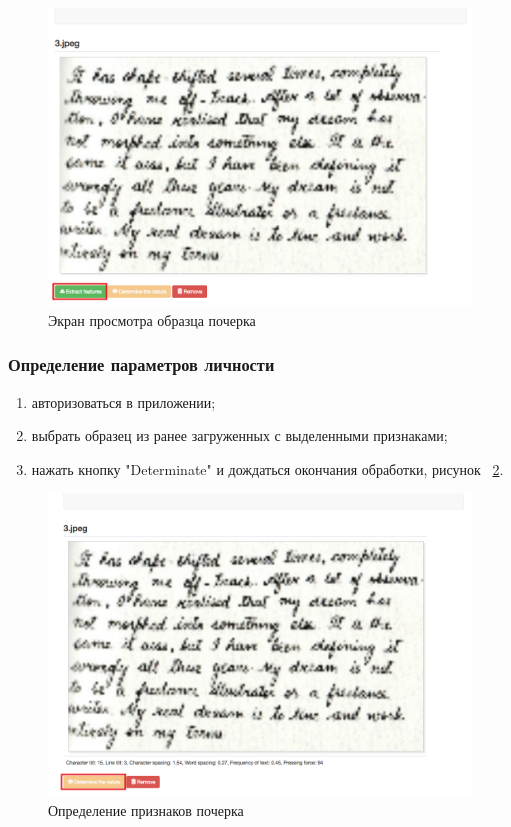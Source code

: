 \begin{figure}[ht]
    \centering
    \includegraphics[width=0.3\textheight]{figures/extract_features.png}
    \caption{Экран просмотра образца почерка}
    \label{fig:manpage:client_man:extract_features}
\end{figure}

\subsubsection{Определение параметров личности}
\label{sec:manpage:client_man:determ_nature}
\begin{enumerate}
    \item[1)] авторизоваться в приложении;
    \item[2)] выбрать образец из ранее загруженных с выделенными признаками;
    \item[3)] нажать кнопку "Determinate" и дождаться окончания обработки, рисунок ~\ref{fig:manpage:client_man:determinate_nature}.
\end{enumerate}

\begin{figure}[ht]
    \centering
    \includegraphics[width=0.3\textheight]{figures/determinate_nature.png}
    \caption{Определение признаков почерка}
    \label{fig:manpage:client_man:determinate_nature}
\end{figure}

